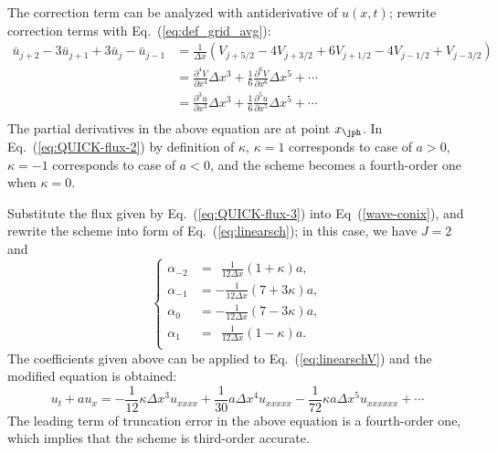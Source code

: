 \documentclass[]{article}
\begin{document}
The correction term can be analyzed with antiderivative of $u(x,t)$; rewrite
correction terms with Eq.~(\ref{eq:def_grid_avg}): 
\begin{equation*}
    \begin{array}{ll}
	\bar u_{j+2}-3\bar u_{j+1}+3\bar u_{j}-\bar u_{j-1}&
	\displaystyle =\frac{1}{\Delta x}
	\left(V_{j+5/2}-4V_{j+3/2}+6V_{j+1/2}-4V_{j-1/2}+V_{j-3/2}\right) \\[3mm]
	&\displaystyle
	=\frac{\partial^4 V}{\partial x^4}\Delta x^3+\frac{1}{6}\frac{\partial^6V}{\partial x^6}\Delta x^5 + \cdots \\[3mm]
	&\displaystyle
	=\frac{\partial^3 u}{\partial x^3}\Delta x^3+\frac{1}{6}\frac{\partial^5u}{\partial x^5}\Delta x^5 + \cdots \\
    \end{array}
\end{equation*}
The partial derivatives in the above equation are at point $x_\jph$. In
Eq.~(\ref{eq:QUICK-flux-2}) by definition of $\kappa$, $\kappa=1$ corresponds to
case of $a>0$, $\kappa=-1$ corresponds to case of $a<0$, and the scheme becomes
a fourth-order one when $\kappa=0$.

Substitute the flux given by Eq.~(\ref{eq:QUICK-flux-3}) into
Eq~(\ref{wave-conix}), and rewrite the scheme into form of
Eq.~(\ref{eq:linearsch}); in this case, we have $J = 2$ and
\begin{equation}
    \left\{\begin{array}{ll}
	\alpha_{-2}&\displaystyle =\ \ \frac{1}{12\Delta x}(1+\kappa)a,\\[3mm]
	\alpha_{-1}&\displaystyle = -\frac{1}{12\Delta x}(7+3\kappa)a,\\[3mm]
	\alpha_{0}&\displaystyle = -\frac{1}{12\Delta x}(7-3\kappa)a,\\[3mm]
	\alpha_{1}&\displaystyle =\ \ \frac{1}{12\Delta x}(1-\kappa)a.\\
    \end{array}\right.
    \label{eq:coeff-of-alpha-in-quick}
\end{equation}
The coefficients given above can be applied to Eq.~(\ref{eq:linearschV})
and the modified equation is obtained:
\begin{equation}
    u_t+au_x =-\frac{1}{12}\kappa \Delta x^3 u_{xxxx}+\frac{1}{30}a \Delta x^4 u_{xxxxx} -\frac{1}{72} \kappa a \Delta x^5 u_{xxxxxx} +\cdots
    \label{eq:modified-quick}
\end{equation}
The leading term of truncation error in the above equation is a fourth-order
one, which implies that the scheme is third-order accurate.
\end{document}
